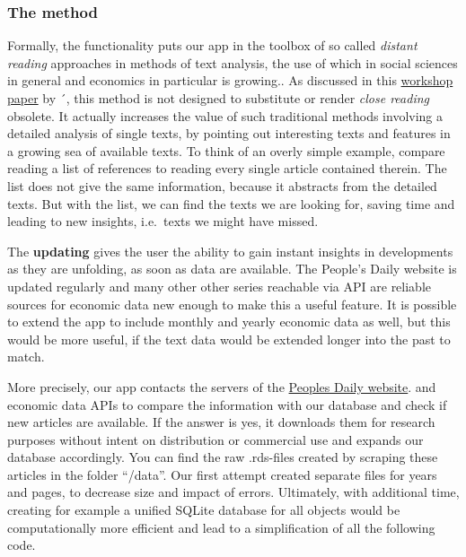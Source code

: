 \documentclass[12pt,a4paper]{article}
\begin{document}
\hypertarget{the-method}{%
\subsubsection{The method}\label{the-method}}

Formally, the functionality puts our app in the toolbox of so called
\emph{distant reading} approaches in methods of text analysis, the use
of which in social sciences in general and economics in particular is
growing.. As discussed in this
\href{http://ceur-ws.org/Vol-1786/scrivner.pdf}{workshop paper} by
\textcite{scrivner_davis2017}´, this method is not designed to
substitute or render \emph{close reading} obsolete. It actually
increases the value of such traditional methods involving a detailed
analysis of single texts, by pointing out interesting texts and features
in a growing sea of available texts. To think of an overly simple
example, compare reading a list of references to reading every single
article contained therein. The list does not give the same information,
because it abstracts from the detailed texts. But with the list, we can
find the texts we are looking for, saving time and leading to new
insights, i.e.~texts we might have missed.

The \textbf{updating} gives the user the ability to gain instant
insights in developments as they are unfolding, as soon as data are
available. The People's Daily website is updated regularly and many
other other series reachable via API are reliable sources for economic
data new enough to make this a useful feature. It is possible to extend
the app to include monthly and yearly economic data as well, but this
would be more useful, if the text data would be extended longer into the
past to match.

More precisely, our app contacts the servers of the
\href{http://paper.people.com.cn/rmrb}{Peoples Daily website}. and
economic data APIs to compare the information with our database and
check if new articles are available. If the answer is yes, it downloads
them for research purposes without intent on distribution or commercial
use and expands our database accordingly. You can find the raw
.rds-files created by scraping these articles in the folder
\enquote{/data}. Our first attempt created separate files for years and
pages, to decrease size and impact of errors. Ultimately, with
additional time, creating for example a unified SQLite database for all
objects would be computationally more efficient and lead to a
simplification of all the following code.
\end{document}
